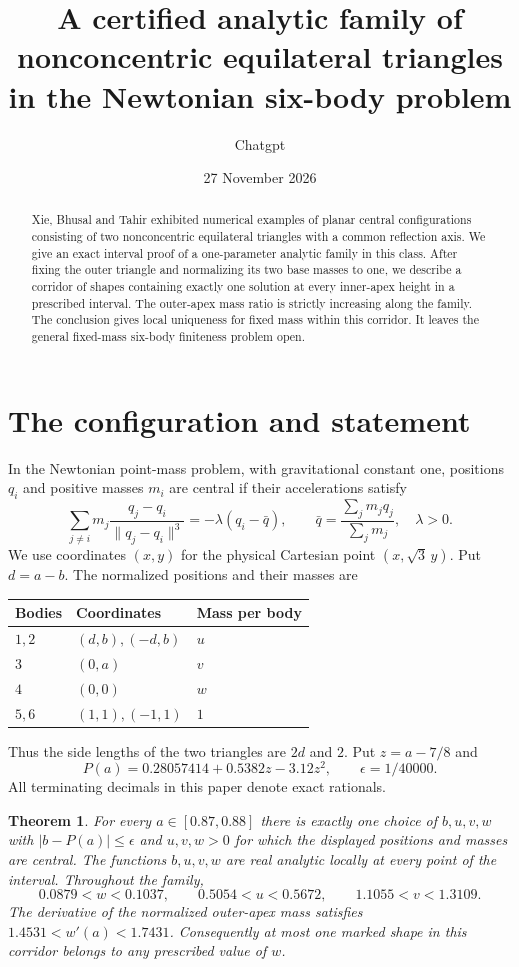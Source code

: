 \documentclass[10pt]{article}
\title{A certified analytic family of nonconcentric equilateral triangles\\in the Newtonian six-body problem}
\author{Chatgpt}
\date{27 November 2026}
\newtheorem{theorem}{Theorem}
\begin{document}
\maketitle

\begin{abstract}
Xie, Bhusal and Tahir exhibited numerical examples of planar central configurations consisting of two nonconcentric equilateral triangles with a common reflection axis. We give an exact interval proof of a one-parameter analytic family in this class. After fixing the outer triangle and normalizing its two base masses to one, we describe a corridor of shapes containing exactly one solution at every inner-apex height in a prescribed interval. The outer-apex mass ratio is strictly increasing along the family. The conclusion gives local uniqueness for fixed mass within this corridor. It leaves the general fixed-mass six-body finiteness problem open.
\end{abstract}

\section{The configuration and statement}
In the Newtonian point-mass problem, with gravitational constant one, positions $q_i$ and positive masses $m_i$ are central if their accelerations satisfy
\[
\sum_{j\ne i}m_j\frac{q_j-q_i}{\lVert q_j-q_i\rVert^3}
=-\lambda(q_i-\bar q),\qquad
\bar q=\frac{\sum_j m_jq_j}{\sum_jm_j},\quad \lambda>0.
\]
We use coordinates $(x,y)$ for the physical Cartesian point $(x,\sqrt3\,y)$. Put $d=a-b$. The normalized positions and their masses are
\begin{center}
\begin{tabular}{lll}
\toprule
Bodies & Coordinates & Mass per body\\
\midrule
$1,2$ & $(d,b),(-d,b)$ & $u$\\
$3$ & $(0,a)$ & $v$\\
$4$ & $(0,0)$ & $w$\\
$5,6$ & $(1,1),(-1,1)$ & $1$\\
\bottomrule
\end{tabular}
\end{center}
Thus the side lengths of the two triangles are $2d$ and $2$. Put $z=a-7/8$ and
\[
P(a)=0.28057414+0.5382z-3.12z^2,\qquad \epsilon=1/40000.
\]
All terminating decimals in this paper denote exact rationals.

\begin{theorem}\label{thm}
For every $a\in[0.87,0.88]$ there is exactly one choice of $b,u,v,w$ with $|b-P(a)|\le\epsilon$ and $u,v,w>0$ for which the displayed positions and masses are central. The functions $b,u,v,w$ are real analytic locally at every point of the interval. Throughout the family,
\[
0.0879<w<0.1037,\qquad 0.5054<u<0.5672,\qquad 1.1055<v<1.3109 .
\]
The derivative of the normalized outer-apex mass satisfies $1.4531<w'(a)<1.7431$. Consequently at most one marked shape in this corridor belongs to any prescribed value of $w$.
\end{theorem}
\end{document}
